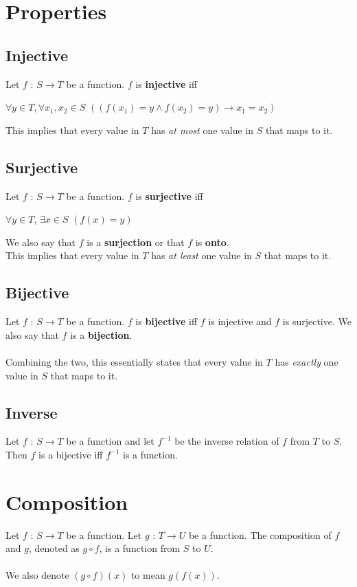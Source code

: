 \documentclass[a4paper]{article}
\begin{document}
\section{Properties}
\subsection{Injective}
Let $f$ : $S \rightarrow T$ be a function. $f$ is \textbf{injective} iff 
\begin{center}
	$\forall y \in T, \forall x_1, x_2 \in S$ $((f(x_1) = y\land f(x_2) = y) \rightarrow x_1 = x_2)$
\end{center}
This implies that every value in $T$ has \textit{at most} one value in $S$ that maps to it.
\subsection{Surjective}
Let $f$ : $S \rightarrow T$ be a function. $f$ is \textbf{surjective} iff
\begin{center}
	$\forall y \in T$, $\exists x \in S$ $(f(x) = y)$
\end{center}
We also say that $f$ is a \textbf{surjection} or that $f$ is \textbf{onto}.\\
This implies that every value in $T$ has \textit{at least} one value in $S$ that maps to it.
\subsection{Bijective}
Let $f$ : $S\rightarrow T$ be a function. $f$ is \textbf{bijective} iff $f$ is injective and $f$ is surjective. We also say that $f$ is a \textbf{bijection}.\\ \\
Combining the two, this essentially states that every value in $T$ has \textit{exactly} one value in $S$ that maps to it.
\subsection{Inverse}
Let $f$ : $S \rightarrow T$ be a function and let $f^{-1}$ be the inverse relation of $f$ from $T$ to $S$. Then $f$ is a bijective iff $f^{-1}$ is a function.

\section{Composition}
Let $f$ : $S\rightarrow T$ be a function. Let $g$ : $T \rightarrow U$ be a function. The composition of $f$ and $g$, denoted as $g \circ f$, is a function from $S$ to $U$.\\\\
We also denote $(g\circ f)(x)$ to mean $g(f(x))$.
\end{document}
